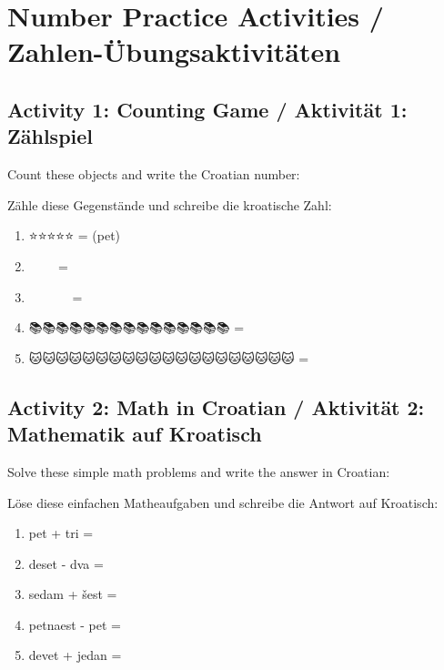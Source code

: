 \section{Number Practice Activities / Zahlen-Übungsaktivitäten}

\begin{exercise}
\subsection*{Activity 1: Counting Game / Aktivität 1: Zählspiel}

Count these objects and write the Croatian number:

Zähle diese Gegenstände und schreibe die kroatische Zahl:

\begin{enumerate}
    \item ⭐⭐⭐⭐⭐ = \underline{\hspace{3cm}} (pet)
    \item 🌸🌸🌸🌸🌸🌸🌸 = \underline{\hspace{3cm}}
    \item 🍎🍎🍎🍎🍎🍎🍎🍎🍎🍎🍎 = \underline{\hspace{3cm}}
    \item 📚📚📚📚📚📚📚📚📚📚📚📚📚📚📚 = \underline{\hspace{3cm}}
    \item 🐱🐱🐱🐱🐱🐱🐱🐱🐱🐱🐱🐱🐱🐱🐱🐱🐱🐱🐱🐱 = \underline{\hspace{3cm}}
\end{enumerate}

\subsection*{Activity 2: Math in Croatian / Aktivität 2: Mathematik auf Kroatisch}

Solve these simple math problems and write the answer in Croatian:

Löse diese einfachen Matheaufgaben und schreibe die Antwort auf Kroatisch:

\begin{enumerate}
    \item pet + tri = \underline{\hspace{3cm}}
    \item deset - dva = \underline{\hspace{3cm}}
    \item sedam + šest = \underline{\hspace{3cm}}
    \item petnaest - pet = \underline{\hspace{3cm}}
    \item devet + jedan = \underline{\hspace{3cm}}
\end{enumerate}


\end{exercise}
